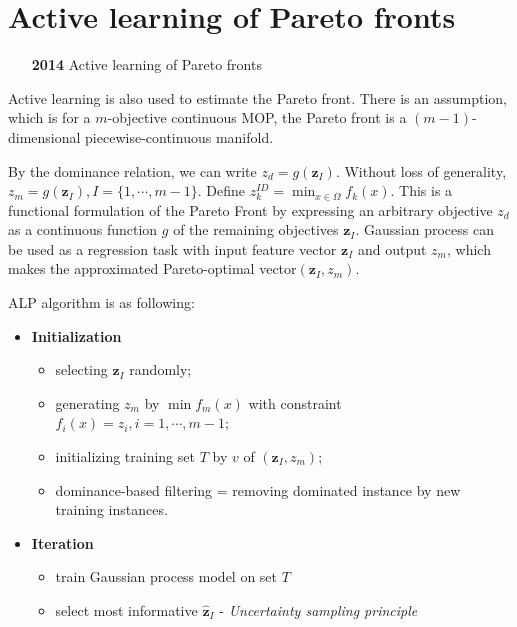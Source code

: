 \section{Active learning of Pareto fronts}

\begin{itemize}
\item [\textbf{2014}] Active learning of Pareto fronts~\cite{6606803}
\end{itemize}

Active learning is also used to estimate the Pareto front.
There is an assumption, which is for a $ m $-objective continuous MOP, the Pareto front is a $ (m-1) $-dimensional piecewise-continuous manifold.

By the dominance relation, we can write $ z_{d} = g(\mathbf{z}_{I}) $.
Without loss of generality, $ z_{m} = g(\mathbf{z}_{I}), I = \{ 1, \cdots , m-1 \} $.
Define $ z^{ID}_{k} = \min_{x \in \Omega} f_{k} (x) $.
This is a functional formulation of the Pareto Front by expressing an arbitrary objective $ z_{d} $ as a continuous function $ g $ of the remaining objectives $ \mathbf{z}_{I} $.
Gaussian process can be used as a regression task with input feature vector $ \mathbf{z}_{I} $ and output $ z_{m} $, which makes the approximated Pareto-optimal vector$ ( \mathbf{z}_{I}, z_{m} ) $.

ALP algorithm is as following:
\begin{itemize}
\item \textbf{Initialization}
\begin{itemize}
\item selecting $ \mathbf{z}_{I} $ randomly;
\item generating $ z_{m} $ by $ \min f_m(x) $ with constraint $ f_{i} (x) = z_{i} , i = 1, \cdots , m-1 $;
\item initializing training set $ T $ by $ v $ of $ (\mathbf{z}_{I} , z_{m}) $;
\item dominance-based filtering = removing dominated instance by new training instances.
\end{itemize}
\item \textbf{Iteration}
\begin{itemize}
\item train Gaussian process model on set $ T $
\item select most informative $ \mathbf{\hat{z}}_{I} $ - \emph{Uncertainty sampling principle}
\end{itemize}
\end{itemize}
